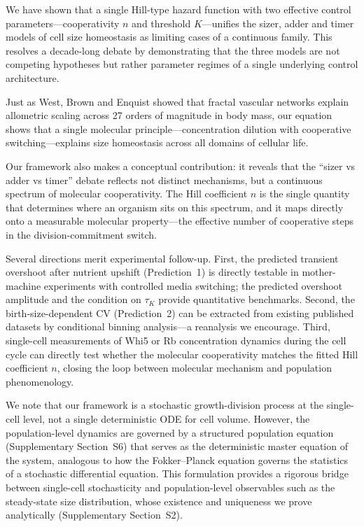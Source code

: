\documentclass[11pt]{article}
\begin{document}
We have shown that a single Hill-type hazard function with two
effective control parameters---cooperativity $n$ and threshold
$K$---unifies the sizer, adder and timer models of cell size
homeostasis as limiting cases of a continuous family.  This resolves
a decade-long debate by demonstrating that the three models are not
competing hypotheses but rather parameter regimes of a single
underlying control architecture.

Just as West, Brown and Enquist showed that fractal vascular
networks explain allometric scaling across 27 orders of magnitude
in body mass\cite{west1997}, our equation shows that a single
molecular principle---concentration dilution with cooperative
switching---explains size homeostasis across all domains of
cellular life.

Our framework also makes a conceptual contribution: it reveals that
the ``sizer vs adder vs timer'' debate reflects not distinct
mechanisms, but a continuous spectrum of molecular cooperativity.
The Hill coefficient $n$ is the single quantity that determines
where an organism sits on this spectrum, and it maps directly onto
a measurable molecular property---the effective number of
cooperative steps in the division-commitment switch.

Several directions merit experimental follow-up.  First, the
predicted transient overshoot after nutrient upshift (Prediction~1)
is directly testable in mother-machine experiments with controlled
media switching; the predicted overshoot amplitude and the
condition on $\tau_K$ provide quantitative benchmarks.  Second,
the birth-size-dependent CV (Prediction~2) can be extracted from
existing published datasets by conditional binning analysis---a
reanalysis we encourage.  Third, single-cell measurements of
Whi5 or Rb concentration dynamics during the cell cycle can
directly test whether the molecular cooperativity matches the
fitted Hill coefficient $n$, closing the loop between molecular
mechanism and population phenomenology.

We note that our framework is a stochastic growth-division process
at the single-cell level, not a single deterministic ODE for cell
volume.  However, the population-level dynamics are governed by a
structured population equation (Supplementary Section~S6) that serves
as the deterministic master equation of the system, analogous to how
the Fokker--Planck equation governs the statistics of a stochastic
differential equation.  This formulation provides a rigorous bridge
between single-cell stochasticity and population-level observables
such as the steady-state size distribution, whose existence and
uniqueness we prove analytically (Supplementary Section~S2).
\end{document}
